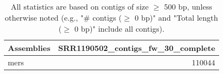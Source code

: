 \documentclass[12pt,a4paper]{article}
\begin{document}
\begin{table}[ht]
\begin{center}
\caption{All statistics are based on contigs of size $\geq$ 500 bp, unless otherwise noted (e.g., "\# contigs ($\geq$ 0 bp)" and "Total length ($\geq$ 0 bp)" include all contigs).}
\begin{tabular}{|l*{1}{|r}|}
\hline
Assemblies & SRR1190502\_contigs\_fw\_30\_complete \\ \hline
mers & 110044 \\ \hline
\end{tabular}
\end{center}
\end{table}
\end{document}
